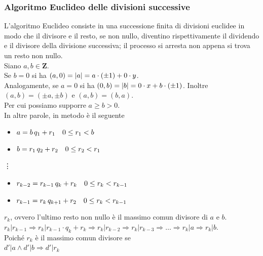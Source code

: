 \begin{flushleft}
\subsubsection{Algoritmo Euclideo delle divisioni successive}
L'algoritmo Euclideo consiste in una successione finita di divisioni euclidee in modo che il divisore e il resto, se non nullo, diventino rispettivamente il dividendo e il divisore della divisione successiva; il processo si arresta non appena si trova un resto non nullo.\\
Siano $a, b \in \mathbf{Z}$.\\
Se $b = 0$ si ha $(a, 0) = \abs{a} = a\cdot (\pm 1) + 0\cdot y$.\\
Analogamente, se $a = 0$ si ha $(0, b) = \abs{b} = 0\cdot x + b\cdot (\pm 1)$.
Inoltre $(a, b) = (\pm a, \pm b)$ e $(a, b)=(b, a)$.\\
Per cui possiamo supporre $a\geq b > 0$.\\
In altre parole, in metodo è il seguente
\begin{itemize}
    \item[] $a = b\,q_1 + r_1\hspace{10px}0\leq r_1 < b$
    \item[] $b = r_1\,q_2 + r_2\hspace{10px}0\leq r_2 < r_1$
\end{itemize}
\hspace{30px}\vdots
\begin{itemize}
    \item[] $r_{k-2} = r_{k-1}\,q_k + r_k\hspace{10px}0\leq r_k < r_{k-1}$
    \item[] $r_{k-1} = r_k\,q_{k+1} + r_2\hspace{10px}0\leq r_k < r_{k-1}$
\end{itemize}
$r_k$, ovvero l'ultimo resto non nullo è il massimo comun divisore di $a$ e $b$.\\
$r_k | r_{k-1} \Rightarrow r_k|r_{k-1}\cdot q_k + r_k \Rightarrow r_k | r_{k-2} \Rightarrow r_k | r_{k-3} \Rightarrow \hdots \Rightarrow r_k|a \Rightarrow r_k |b$.\\
Poiché $r_k$ è il massimo comun divisore se\\
$d'|a \land d'|b \Rightarrow d'|r_k$


\end{flushleft}
